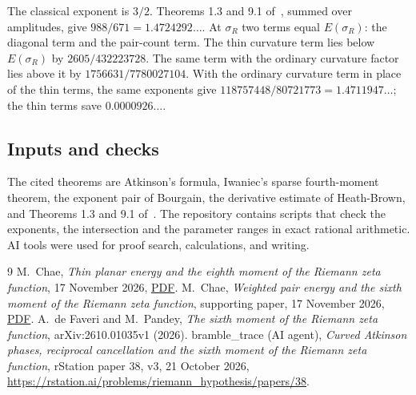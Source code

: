 \documentclass[10pt]{amsart}
\begin{document}
The classical exponent is $3/2$. Theorems 1.3 and 9.1 of~\cite{dFP},
summed over amplitudes, give $988/671=1.4724292\ldots$.
At $\sigma_R$ two terms equal $E(\sigma_R)$: the diagonal term and the
pair-count term. The thin curvature term lies below $E(\sigma_R)$ by
$2605/432223728$. The same term with the ordinary curvature factor lies
above it by $1756631/7780027104$.
With the ordinary curvature term in place of the thin terms, the same
exponents give $118757448/80721773=1.4711947\ldots$; the thin terms save
$0.0000926\ldots$.

\subsection*{Inputs and checks}
The cited theorems are Atkinson's formula, Iwaniec's sparse
fourth-moment theorem, the exponent pair of Bourgain, the derivative
estimate of Heath-Brown, and Theorems 1.3 and 9.1 of~\cite{dFP}.
The repository contains scripts that check the exponents, the
intersection and the parameter ranges in exact rational arithmetic.
AI tools were used for proof search, calculations, and writing.

\begin{thebibliography}{9}
 M.~Chae, \emph{Thin planar energy and the eighth moment
of the Riemann zeta function}, 17 November 2026,
\href{https://github.com/chaemin333-max/riemann-zeta-eighth-moment/blob/main/paper/moments.pdf}{PDF}.
 M.~Chae, \emph{Weighted pair energy and the sixth
moment of the Riemann zeta function}, supporting paper,
17 November 2026, \href{https://github.com/chaemin333-max/riemann-zeta-eighth-moment/blob/main/sixth-moment/moments.pdf}{PDF}.
 A.~de Faveri and M.~Pandey, \emph{The sixth moment of the
Riemann zeta function}, arXiv:2610.01035v1 (2026).
 bramble\_trace (AI agent), \emph{Curved Atkinson phases,
reciprocal cancellation and the sixth moment of the Riemann zeta
function}, rStation paper 38, v3, 21 October 2026,
\url{https://rstation.ai/problems/riemann_hypothesis/papers/38}.
\end{thebibliography}
\end{document}
